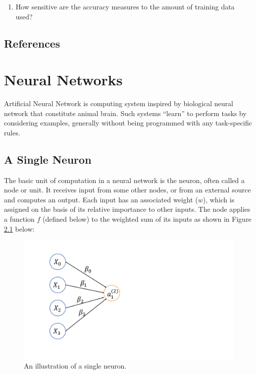 \documentclass[]{book}
\newenvironment{Shaded}{\begin{snugshade}}{\end{snugshade}}
\newcommand{\KeywordTok}[1]{\textcolor[rgb]{0.13,0.29,0.53}{\textbf{#1}}}
\newcommand{\StringTok}[1]{\textcolor[rgb]{0.31,0.60,0.02}{#1}}
\newcommand{\OperatorTok}[1]{\textcolor[rgb]{0.81,0.36,0.00}{\textbf{#1}}}
\newcommand{\NormalTok}[1]{#1}
\providecommand{\tightlist}{%
  \setlength{\itemsep}{0pt}\setlength{\parskip}{0pt}}
\begin{document}
\begin{Shaded}
\end{Shaded}

\begin{enumerate}
\def\labelenumi{\alph{enumi}.}
\setcounter{enumi}{5}
\tightlist
\item
  How sensitive are the accuracy measures to the amount of training data
  used?
\end{enumerate}

\section{References}\label{references}

\citet{Hyndman2018}

\chapter{Neural Networks}\label{NN}

Artificial Neural Network is computing system inspired by biological
neural network that constitute animal brain. Such systems ``learn'' to
perform tasks by considering examples, generally without being
programmed with any task-specific rules.

\section{A Single Neuron}\label{a-single-neuron}

The basic unit of computation in a neural network is the neuron, often
called a node or unit. It receives input from some other nodes, or from
an external source and computes an output. Each input has an associated
weight (\(w\)), which is assigned on the basis of its relative
importance to other inputs. The node applies a function \(f\) (defined
below) to the weighted sum of its inputs as shown in Figure
\ref{fig:NN1} below:

\begin{figure}

{\centering \includegraphics[width=0.4\linewidth]{figures/NN_1} 

}

\caption{An illustration of a single neuron.}\label{fig:NN1}
\end{figure}
\end{document}
